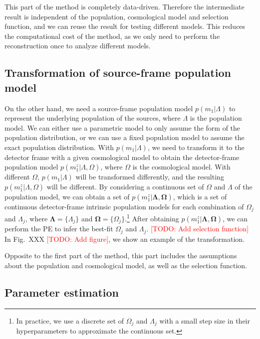 \documentclass[aps,prd,twocolumn,superscriptaddress,preprintnumbers,nofootinbib,hidelinks]{revtex4-2}
\newcommand{\todo}[1]{\textcolor{red}{[TODO: #1]}}
\begin{document}
This part of the method is completely data-driven.
Therefore the intermediate result is independent of the population, cosmological model and selection function, and we can reuse the result for testing different models.
This reduces the computational cost of the method, as we only need to perform the reconstruction once to analyze different models.

\subsection{Transformation of source-frame population model}
\label{sec:transformation}

On the other hand, we need a source-frame population model $p(m_1|\Lambda)$ to represent the underlying population of the sources, where $\Lambda$ is the population model.
We can either use a parametric model to only assume the form of the population distribution, or we can use a fixed population model to assume the exact population distribution.
With $p(m_1|\Lambda)$, we need to transform it to the detector frame with a given cosmological model to obtain the detector-frame population model $p(m^z_1|\Lambda, \Omega)$, where $\Omega$ is the cosmological model.
With different $\Omega$, $p(m_1|\Lambda)$ will be transformed differently, and the resulting $p(m^z_1|\Lambda, \Omega)$ will be different.
By considering a continuous set of $\Omega$ and  $\Lambda$ of the population model, we can obtain a set of $p(m^z_1|\mathbf{\Lambda}, \mathbf{\Omega})$, which is a set of continuous detector-frame intrinsic population models for each combination of $\Omega_j$ and $\Lambda_j$, where $\mathbf{\Lambda} = \{\Lambda_j\}$ and $\mathbf{\Omega} = \{\Omega_j\}$.\footnote{In practice, we use a discrete set of $\Omega_j$ and $\Lambda_j$ with a small step size in their hyperparameters to approximate the continuous set.}
After obtaining $p(m^z_1|\mathbf{\Lambda}, \mathbf{\Omega})$, we can perform the \ac{PE} to infer the best-fit $\Omega_j$ and $\Lambda_j$.
\todo{Add selection function}
In Fig.~XXX \todo{Add figure}, we show an example of the transformation.

Opposite to the first part of the method, this part includes the assumptions about the population and cosmological model, as well as the selection function.

\subsection{Parameter estimation}
\label{sec:pe}
\end{document}
